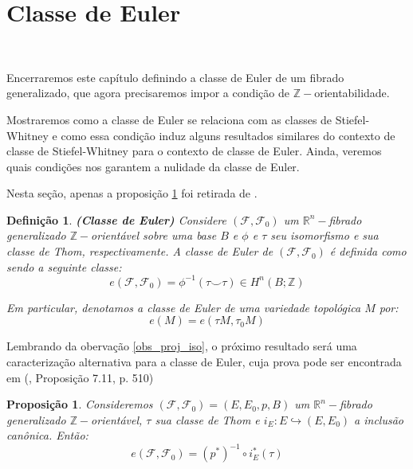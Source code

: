 \documentclass[12pt,oneside]{book} %
\newtheorem{defi}   {\hspace{0.5cm}Defini\c c\~ao}[chapter]
\newtheorem{prop}   {\hspace{0.5cm}Proposi\c c\~ao}[chapter]
\newcommand{\R}{\mathbb{R}}
\newcommand{\Z}{\mathbb{Z}}
\newcommand{\ccup}{\smile}
\begin{document}
\section{Classe de Euler}\label{secao_euler}

\

\par Encerraremos este capítulo definindo a classe de Euler de um fibrado generalizado, que agora precisaremos impor a condição de $\Z-$orientabilidade.

\par Mostraremos como a classe de Euler se relaciona com as classes de Stiefel-Whitney e como essa condição induz alguns resultados similares do contexto de classe de Stiefel-Whitney para o contexto de classe de Euler. Ainda, veremos quais condições nos garantem a nulidade da classe de Euler.

\par Nesta seção, apenas a proposição \ref{euler_2} foi retirada de \cite{fadell_1}.

\begin{defi}{\bf (Classe de Euler)}
	Considere $(\mathcal{F},\mathcal{F}_{0})$ um $\R^{n}-$fibrado generalizado $\Z-$orientável sobre uma base $B$ e $\phi$ e $\tau$ seu isomorfismo e sua classe de Thom, respectivamente. A classe de Euler de $(\mathcal{F},\mathcal{F}_{0})$ é definida como sendo a seguinte classe:
	$$ e(\mathcal{F},\mathcal{F}_{0})=\phi^{-1}(\tau\ccup \tau)\in H^{n}(B;\Z) $$
	
	\par Em particular, denotamos a classe de Euler de uma variedade topológica $M$ por:
	$$ e(M)=e(\tau M,\tau_{0}M) $$
\end{defi}

\par Lembrando da obervação \ref{obs_proj_iso}, o próximo resultado será uma caracterização alternativa para a classe de Euler, cuja prova pode ser encontrada em (\cite{fadell_1}, Proposição 7.11, p. 510)

\begin{prop}\label{euler_2}
	Consideremos $(\mathcal{F},\mathcal{F}_{0})=(E,E_{0},p,B)$ um $\R^{n}-$fibrado generalizado $\Z-$orientável, $\tau$ sua classe de Thom e $i_{E}:E\hookrightarrow (E,E_{0})$ a inclusão canônica. Então:
	$$ e(\mathcal{F},\mathcal{F}_{0})=(p^{*})^{-1}\circ i_{E}^{*}(\tau) $$
\end{prop}
\end{document}
